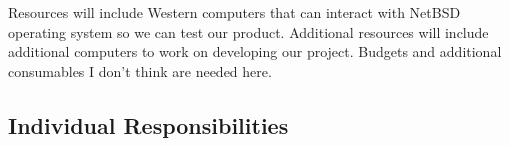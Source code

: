Resources will include Western computers that can interact with NetBSD operating system so we can test our product. Additional resources will include 
additional computers to work on developing our project. Budgets and additional consumables I don’t think are needed here. 


\subsection{Individual Responsibilities}
%



